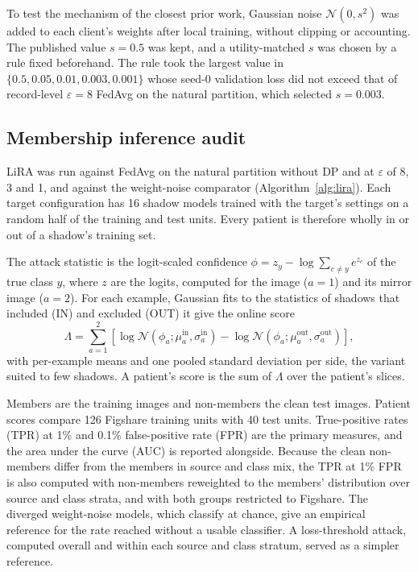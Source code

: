 \documentclass[preprint,12pt]{elsarticle}
\begin{document}
To test the mechanism of the closest prior work,\cite{gupta2026} Gaussian noise $\mathcal{N}(0,s^2)$ was added to
each client's weights after local training, without clipping or accounting. The published value $s=0.5$ was kept, and
a utility-matched $s$ was chosen by a rule fixed beforehand. The rule took the largest value in $\{0.5, 0.05, 0.01,
0.003, 0.001\}$ whose seed-0 validation loss did not exceed that of record-level $\varepsilon=8$ FedAvg on the
natural partition, which selected $s=0.003$.

\subsection{Membership inference audit}
LiRA\cite{carlini2022} was run against FedAvg on the natural partition without DP and at $\varepsilon$ of 8, 3 and 1,
and against the weight-noise comparator (Algorithm~\ref{alg:lira}). Each target configuration has 16 shadow models
trained with the target's settings on a random half of the training and test units. Every patient is therefore
wholly in or out of a shadow's training set.

The attack statistic is the logit-scaled confidence $\phi=z_y-\log\sum_{c\ne y}e^{z_c}$ of the true class $y$, where
$z$ are the logits, computed for the image ($a=1$) and its mirror image ($a=2$). For each example, Gaussian fits to the
statistics of shadows that included (IN) and excluded (OUT) it give the online score
\begin{equation}
\Lambda=\sum_{a=1}^{2}\left[\log\mathcal{N}\!\left(\phi_a;\mu^{\mathrm{in}}_a,\sigma^{\mathrm{in}}_a\right)
-\log\mathcal{N}\!\left(\phi_a;\mu^{\mathrm{out}}_a,\sigma^{\mathrm{out}}_a\right)\right],
\label{eq:lira}
\end{equation}
with per-example means and one pooled standard deviation per side, the variant suited to few shadows. A patient's
score is the sum of $\Lambda$ over the patient's slices.

Members are the training images and non-members the clean test images. Patient scores compare 126 Figshare training
units with 40 test units. True-positive rates (TPR) at 1\% and 0.1\% false-positive rate (FPR) are the primary
measures, and the area under the curve (AUC) is reported alongside. Because the clean non-members differ from the
members in source and class mix, the TPR at 1\% FPR is also computed with non-members reweighted to the members'
distribution over source and class strata, and with both groups restricted to Figshare. The diverged weight-noise
models, which classify at chance, give an empirical reference for the rate reached without a usable classifier. A loss-threshold attack, computed overall and within
each source and class stratum, served as a simpler reference.
\end{document}
